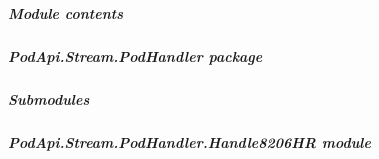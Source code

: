\documentclass[letterpaper,10pt,english]{sphinxmanual}
\begin{document}
\subparagraph{Module contents}
\label{\detokenize{PodApi.Stream.Drain:module-PodApi.Stream.Drain}}\label{\detokenize{PodApi.Stream.Drain:module-contents}}
\sphinxstepscope


\subparagraph{PodApi.Stream.PodHandler package}
\label{\detokenize{PodApi.Stream.PodHandler:podapi-stream-podhandler-package}}\label{\detokenize{PodApi.Stream.PodHandler::doc}}

\subparagraph{Submodules}
\label{\detokenize{PodApi.Stream.PodHandler:submodules}}

\subparagraph{PodApi.Stream.PodHandler.Handle8206HR module}
\label{\detokenize{PodApi.Stream.PodHandler:module-PodApi.Stream.PodHandler.Handle8206HR}}\label{\detokenize{PodApi.Stream.PodHandler:podapi-stream-podhandler-handle8206hr-module}}
\end{document}
